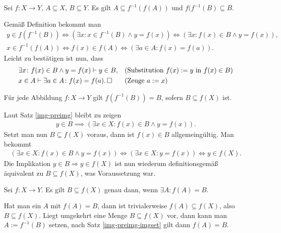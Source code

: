 \begin{Satz}\label{img-preimg}
Sei $f\colon X\to Y$, $A\subseteq X$, $B\subseteq Y$. Es gilt
$A\subseteq f^{-1}(f(A))$ und $f(f^{-1}(B)\subseteq B$.
\end{Satz}
\begin{Beweis}
Gemäß Definition bekommt man
\begin{gather*}
y\in f(f^{-1}(B))
\iff (\exists x\colon x\in f^{-1}(B)\land y=f(x))
\iff (\exists x\colon f(x)\in B\land y=f(x)),\\
x\in f^{-1}(f(A)) \iff f(x)\in f(A)
\iff (\exists a\in A\colon f(x)=f(a)).
\end{gather*}
Leicht zu bestätigen ist nun, dass
\begin{align*}
& \exists x\colon f(x)\in B\land y=f(x)\vdash y\in B, && (\text{Substitution $f(x):=y$ in $f(x)\in B$})\\
& x\in A\vdash\exists a\in A\colon f(x)=f(a).\,\square && (\text{Zeuge $a:=x$})
\end{align*}
\end{Beweis}

\begin{Satz}\label{img-preimg-imgset}
Für jede Abbildung $f\colon X\to Y$ gilt $f(f^{-1}(B))=B$,
sofern $B\subseteq f(X)$ ist.
\end{Satz}
\begin{Beweis}
Laut Satz \ref{img-preimg} bleibt zu zeigen
\begin{gather*}
y\in B\implies (\exists x\in X\colon f(x)\in B\land y=f(x)).
\end{gather*}
Setzt man nun $B\subseteq f(X)$ voraus, dann ist $f(x)\in B$
allgemeingültig. Man bekommt
\begin{gather*}
(\exists x\in X\colon f(x)\in B\land y=f(x))
\iff (\exists x\in X\colon y=f(x))\iff y\in f(X).
\end{gather*}
Die Implikation $y\in B\Rightarrow y\in f(X)$ ist nun
wiederum definitionsgemäß äquivalent zu $B\subseteq f(X)$,
was Voraussetzung war.\;\qedsymbol
\end{Beweis}

\begin{Satz}
Sei $f\colon X\to Y$. Es gilt $B\subseteq f(X)$ genau dann,
wenn $\exists A\colon f(A)=B$.
\end{Satz}
\begin{Beweis}
Hat man ein $A$ mit $f(A)=B$, dann ist trivialerweise
$f(A)\subseteq f(X)$, also $B\subseteq f(X)$. Liegt umgekehrt
eine Menge $B\subseteq f(X)$ vor, dann kann man $A:=f^{-1}(B)$
setzen, nach Satz \ref{img-preimg-imgset} gilt dann $f(A)=B$.\,\qedsymbol
\end{Beweis}


